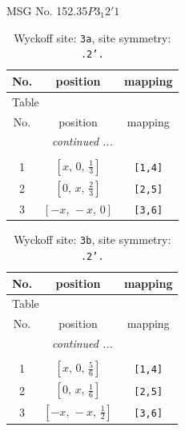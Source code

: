 \documentclass[fleqn,8pt]{jsarticle}
\begin{document}
\setcounter{MaxMatrixCols}{32}

\renewcommand{\tablename}{Table~}
\renewcommand{\figurename}{Figure~}
\begin{center}
\LARGE
MSG No. 152.35\quad$P3_{1}2'1$
\end{center}
\renewcommand{\arraystretch}{1.2}
\begin{longtable}{ccc}
\caption{Wyckoff site: {\tt 3a}, site symmetry: {\tt .2'.}}
 \\
 \hline \hline
No. & position & mapping \\ \hline \endfirsthead

\multicolumn{2}{l}{\tablename\ \thetable{}} \\
 \hline \hline
No. & position & mapping \\ \hline \endhead

 \hline \hline
\multicolumn{2}{r}{\footnotesize\it continued ...} \\ \endfoot

 \hline \hline
\multicolumn{2}{r}{} \\ \endlastfoot

1 & $\left[ x,\, 0,\, \frac{1}{3} \right]$ & {\tt [1,4]} \\ \hline
2 & $\left[ 0,\, x,\, \frac{2}{3} \right]$ & {\tt [2,5]} \\ \hline
3 & $\left[ - x,\, - x,\, 0 \right]$ & {\tt [3,6]} \\
\end{longtable}
\renewcommand{\arraystretch}{1.2}
\begin{longtable}{ccc}
\caption{Wyckoff site: {\tt 3b}, site symmetry: {\tt .2'.}}
 \\
 \hline \hline
No. & position & mapping \\ \hline \endfirsthead

\multicolumn{2}{l}{\tablename\ \thetable{}} \\
 \hline \hline
No. & position & mapping \\ \hline \endhead

 \hline \hline
\multicolumn{2}{r}{\footnotesize\it continued ...} \\ \endfoot

 \hline \hline
\multicolumn{2}{r}{} \\ \endlastfoot

1 & $\left[ x,\, 0,\, \frac{5}{6} \right]$ & {\tt [1,4]} \\ \hline
2 & $\left[ 0,\, x,\, \frac{1}{6} \right]$ & {\tt [2,5]} \\ \hline
3 & $\left[ - x,\, - x,\, \frac{1}{2} \right]$ & {\tt [3,6]} \\
\end{longtable}
\end{document}
